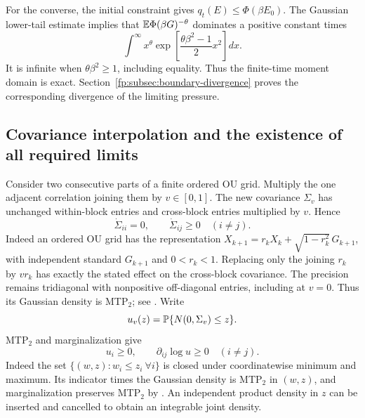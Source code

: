 For the converse, the initial constraint gives $q_t(E)\le\Phi(\beta E_0)$. The Gaussian lower-tail estimate implies that $\mathbb E\Phi(\beta G)^{-\theta}$ dominates a positive constant times
\[
 \int^\infty x^\theta
 \exp\left[\frac{\theta\beta^2-1}{2}x^2\right]dx.
\]
It is infinite when $\theta\beta^2\ge1$, including equality. Thus the finite-time moment domain is exact. Section~\ref{fp:subsec:boundary-divergence} proves the corresponding divergence of the limiting pressure.

\subsection{Covariance interpolation and the existence of all required limits}
Consider two consecutive parts of a finite ordered OU grid. Multiply the one adjacent correlation joining them by $v\in[0,1]$. The new covariance $\Sigma_v$ has unchanged within-block entries and cross-block entries multiplied by $v$. Hence
\[
 \dot\Sigma_{ii}=0,\qquad\dot\Sigma_{ij}\ge0\quad(i\ne j).
\]
Indeed an ordered OU grid has the representation
$X_{k+1}=r_kX_k+\sqrt{1-r_k^2}\,G_{k+1}$, with independent standard
$G_{k+1}$ and $0<r_k<1$. Replacing only the joining $r_k$ by $vr_k$
has exactly the stated effect on the cross-block covariance. The
precision remains tridiagonal with nonpositive off-diagonal entries,
including at $v=0$. Thus its Gaussian density is MTP$_2$; see
\cite[Section~4.1]{Fallat}. Write
\[
 u_v(z)=\mathbb P\{N(0,\Sigma_v)\le z\}.
\]
MTP$_2$ and marginalization give
\begin{equation}\label{fp:eq:cdf-mtp}
 u_i\ge0,\qquad\partial_{ij}\log u\ge0\quad(i\ne j).
\end{equation}
Indeed the set $\{(w,z):w_i\le z_i\ \forall i\}$ is closed under
coordinatewise minimum and maximum. Its indicator times the Gaussian
density is MTP$_2$ in $(w,z)$, and marginalization preserves MTP$_2$
by \cite[Proposition~3.4]{Fallat}. An independent product density in
$z$ can be inserted and cancelled to obtain an integrable joint density.

